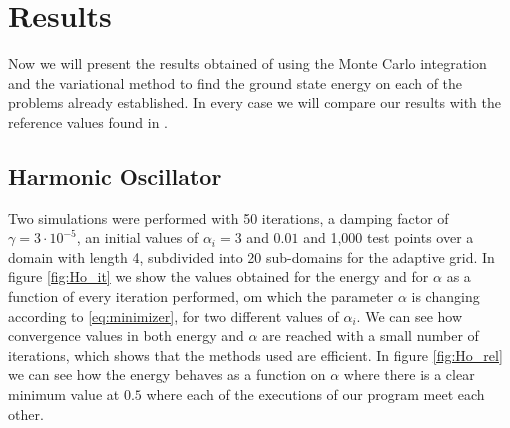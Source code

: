 
\section{Results}
Now we will present the results obtained of using the Monte Carlo integration and the variational
method to find the ground state energy on each of the problems already established. In every case
we will compare
our results with the reference values found in \cite{JosBook}.

\subsection{Harmonic Oscillator}
Two simulations were performed with 50 iterations, a damping factor of $\gamma = 3\cdot 10^{-5}$,
an initial values of $\alpha_i = 3$ and $0.01$  and 1,000 test points over a domain with length 4,
subdivided into 20 sub-domains for the adaptive grid. In figure \ref{fig:Ho_it}
we show the values obtained for the energy and for $\alpha$ as a function of every iteration performed,
om which the parameter $\alpha$ is changing according to \ref{eq:minimizer},
for two different values of $\alpha_i$. We can see how  convergence values in both energy and $\alpha$ are
reached with a small number of iterations, which shows that the methods used are efficient. In figure
 \ref{fig:Ho_rel} we can see how the energy behaves as a function on $\alpha$ where there is a clear
minimum value at $0.5$ where each of the executions of our program meet each other.

